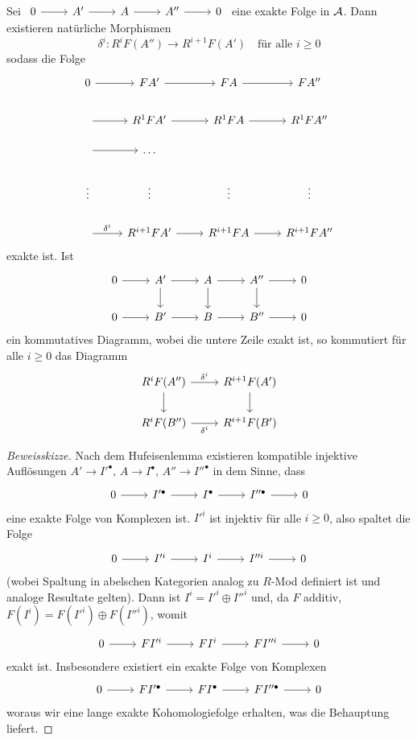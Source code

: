 \begin{sa}\label{8.3}
	Sei $\begin{tikzcd}
	0\arrow{r} & A'\arrow{r} & A \arrow{r} & A''\arrow{r} & 0
	\end{tikzcd}$ eine exakte Folge in $\mathcal{A}$. Dann existieren natürliche Morphismen 
	$$\delta^i:R^iF(A'') \longrightarrow R^{i+1}F(A') \quad \text{für alle } i\geq 0$$
	sodass die Folge 
	$$\begin{tikzcd}
	0 \arrow{r} & FA'\arrow{r} & FA \arrow{r} & FA''\\
	\arrow{r} & R^1FA' \arrow{r} & R^1FA \arrow{r} & R^1FA''\\
	\arrow{r} & \ldots & & \\
	\vdots & \vdots & \vdots & \vdots \\
	\arrow{r}{\delta^i} & R^{i+1}FA' \arrow{r} & R^{i+1}FA \arrow{r} & R^{i+1}FA''
	\end{tikzcd}$$
	exakte ist. Ist 
	$$\begin{tikzcd}
	0 \arrow{r} & A' \arrow{d}\arrow{r} & A \arrow{d}\arrow{r} & A'' \arrow{d}\arrow{r} & 0\\
	0 \arrow{r} & B'\arrow{r} & B \arrow{r} & B'' \arrow{r} & 0
	\end{tikzcd}$$
	ein kommutatives Diagramm, wobei die untere Zeile exakt ist, so kommutiert für alle $i\geq 0$ das Diagramm
	$$\begin{tikzcd}
	R^iF(A'') \arrow{r}{\delta^i} \arrow{d} & R^{i+1}F(A') \arrow{d} \\
	R^iF(B'') \arrow[swap]{r}{\delta^i} & R^{i+1}F(B')
	\end{tikzcd}$$
\end{sa}
\begin{proof}[Beweisskizze]
	Nach dem Hufeisenlemma existieren kompatible injektive Auflösungen $A'\to I'^\bullet, \, A\to I^\bullet, \, A''\to I''^\bullet$ in dem Sinne, dass
	$$\begin{tikzcd}
	0 \arrow{r} & I'^\bullet\arrow{r} & I^\bullet\arrow{r} & I''^\bullet \arrow{r} & 0
	\end{tikzcd}$$
	eine exakte Folge von Komplexen ist. $I'^i$ ist injektiv für alle $i\geq 0$, also spaltet die Folge
	$$ \begin{tikzcd}
	0 \arrow{r} & I'^i\arrow{r} & I^i\arrow{r} &I''^i \arrow{r} & 0
	\end{tikzcd}$$
	(wobei Spaltung in abelschen Kategorien analog zu $R$-Mod definiert ist und analoge Resultate gelten). Dann ist 
	$I^i= I'^i \oplus I''^i$ und, da $F$ additiv, $F(I^i) = F(I'^i) \oplus F(I''^i)$, womit
	$$\begin{tikzcd}
	0 \arrow{r} & FI'^i \arrow{r} & FI^i \arrow{r} & FI''^i \arrow{r} & 0
	\end{tikzcd}$$ exakt ist. Insbesondere existiert ein exakte Folge von Komplexen 
	$$\begin{tikzcd}
	0 \arrow{r} & FI'^\bullet\arrow{r} & FI^\bullet\arrow{r} & FI''^\bullet \arrow{r} & 0
	\end{tikzcd}$$
	woraus wir eine lange exakte Kohomologiefolge erhalten, was die Behauptung liefert.
\end{proof}
